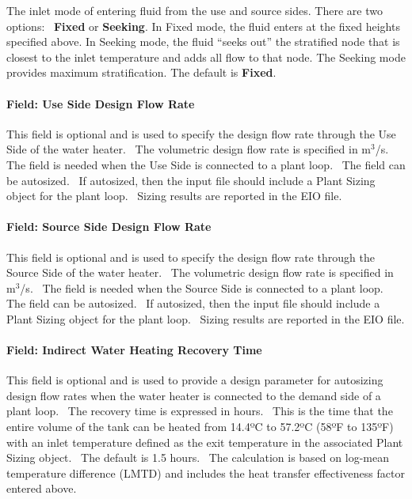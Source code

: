 The inlet mode of entering fluid from the use and source sides. There are two options:~ \textbf{Fixed} or \textbf{Seeking}. In Fixed mode, the fluid enters at the fixed heights specified above. In Seeking mode, the fluid ``seeks out'' the stratified node that is closest to the inlet temperature and adds all flow to that node. The Seeking mode provides maximum stratification. The default is \textbf{Fixed}.

\paragraph{Field: Use Side Design Flow Rate}\label{field-use-side-design-flow-rate-1-000}

This field is optional and is used to specify the design flow rate through the Use Side of the water heater.~ The volumetric design flow rate is specified in m\(^{3}\)/s.~ The field is needed when the Use Side is connected to a plant loop.~ The field can be autosized.~ If autosized, then the input file should include a Plant Sizing object for the plant loop.~ Sizing results are reported in the EIO file.

\paragraph{Field: Source Side Design Flow Rate}\label{field-source-side-design-flow-rate-1-000}

This field is optional and is used to specify the design flow rate through the Source Side of the water heater.~ The volumetric design flow rate is specified in m\(^{3}\)/s.~ The field is needed when the Source Side is connected to a plant loop.~ The field can be autosized.~ If autosized, then the input file should include a Plant Sizing object for the plant loop.~ Sizing results are reported in the EIO file.

\paragraph{Field: Indirect Water Heating Recovery Time}\label{field-indirect-water-heating-recovery-time-1}

This field is optional and is used to provide a design parameter for autosizing design flow rates when the water heater is connected to the demand side of a plant loop.~ The recovery time is expressed in hours.~ This is the time that the entire volume of the tank can be heated from 14.4ºC to 57.2ºC (58ºF to 135ºF) with an inlet temperature defined as the exit temperature in the associated Plant Sizing object.~ The default is 1.5 hours.~ The calculation is based on log-mean temperature difference (LMTD) and includes the heat transfer effectiveness factor entered above.

